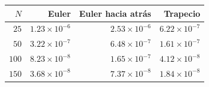 \begin{tabular}{r r r r}
\toprule
\rowcolor{Azul1!50}
$N$ & Euler & Euler hacia atrás & Trapecio \\
\midrule
$25$ & $1.23\times10^{-6}$ & $2.53\times10^{-6}$ & $6.22\times10^{-7}$ \\
$50$ & $3.22\times10^{-7}$ & $6.48\times10^{-7}$ & $1.61\times10^{-7}$ \\
$100$ & $8.23\times10^{-8}$ & $1.65\times10^{-7}$ & $4.12\times10^{-8}$ \\
$150$ & $3.68\times10^{-8}$ & $7.37\times10^{-8}$ & $1.84\times10^{-8}$ \\
\bottomrule
\end{tabular}
